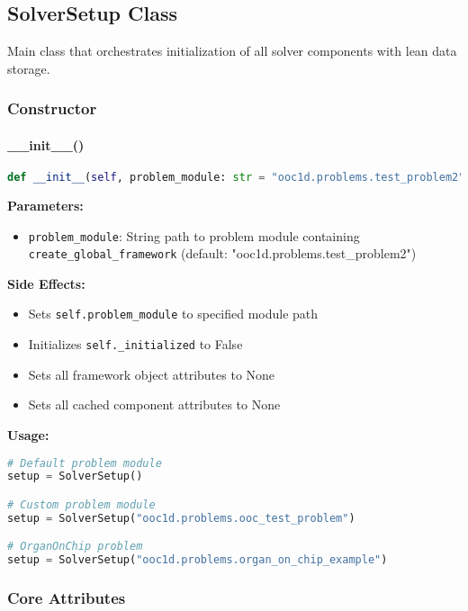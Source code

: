 \subsection{SolverSetup Class}
\label{subsec:solver_setup_class_detailed}

Main class that orchestrates initialization of all solver components with lean data storage.

\subsubsection{Constructor}

\paragraph{\_\_init\_\_()}
\begin{lstlisting}[language=Python, caption=SolverSetup Constructor]
def __init__(self, problem_module: str = "ooc1d.problems.test_problem2")
\end{lstlisting}

\textbf{Parameters:}
\begin{itemize}
    \item \texttt{problem\_module}: String path to problem module containing \texttt{create\_global\_framework} (default: "ooc1d.problems.test\_problem2")
\end{itemize}

\textbf{Side Effects:} 
\begin{itemize}
    \item Sets \texttt{self.problem\_module} to specified module path
    \item Initializes \texttt{self.\_initialized} to False
    \item Sets all framework object attributes to None
    \item Sets all cached component attributes to None
\end{itemize}

\textbf{Usage:}
\begin{lstlisting}[language=Python, caption=Constructor Usage Examples]
# Default problem module
setup = SolverSetup()

# Custom problem module
setup = SolverSetup("ooc1d.problems.ooc_test_problem")

# OrganOnChip problem
setup = SolverSetup("ooc1d.problems.organ_on_chip_example")
\end{lstlisting}

\subsubsection{Core Attributes}

